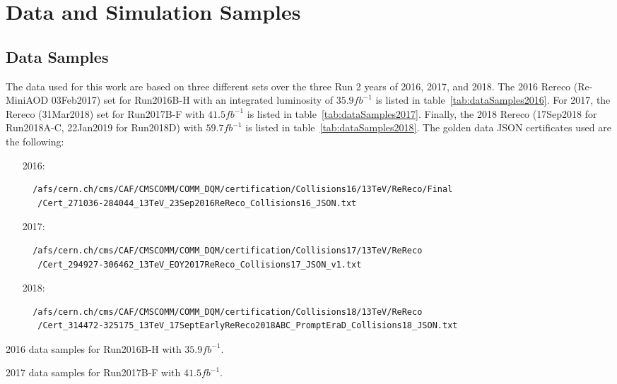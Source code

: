 
\chapter{Data and Simulation Samples}
\label{chap:appendixSamples}

\section{Data Samples}

The data used for this work are based on three different sets over the three Run 2 years of 2016, 2017, and 2018.
The 2016 Rereco (Re-MiniAOD 03Feb2017) set for Run2016B-H with an integrated luminosity of $35.9\unit{fb^{-1}}$ is listed in table~\ref{tab:dataSamples2016}.
For 2017, the Rereco (31Mar2018) set for Run2017B-F with $41.5\unit{fb^{-1}}$ is listed in table~\ref{tab:dataSamples2017}.
Finally, the 2018 Rereco (17Sep2018 for Run2018A-C, 22Jan2019 for Run2018D) with $59.7\unit{fb^{-1}}$ is listed in table~\ref{tab:dataSamples2018}\footnotemark.
The golden data JSON certificates used are the following:
\begin{itemize}
  \item[2016:]
  \begingroup
  \fontsize{9pt}{12pt}
  \begin{verbatim}
  /afs/cern.ch/cms/CAF/CMSCOMM/COMM_DQM/certification/Collisions16/13TeV/ReReco/Final
   /Cert_271036-284044_13TeV_23Sep2016ReReco_Collisions16_JSON.txt
  \end{verbatim}
  \endgroup
  \item[2017:]
  \begingroup
  \fontsize{9pt}{12pt}
  \begin{verbatim}
  /afs/cern.ch/cms/CAF/CMSCOMM/COMM_DQM/certification/Collisions17/13TeV/ReReco
   /Cert_294927-306462_13TeV_EOY2017ReReco_Collisions17_JSON_v1.txt
  \end{verbatim}
  \endgroup
  \item[2018:]
  \begingroup
  \fontsize{9pt}{12pt}
  \begin{verbatim}
  /afs/cern.ch/cms/CAF/CMSCOMM/COMM_DQM/certification/Collisions18/13TeV/ReReco
   /Cert_314472-325175_13TeV_17SeptEarlyReReco2018ABC_PromptEraD_Collisions18_JSON.txt
  \end{verbatim}
  \endgroup
\end{itemize}

\begin{table}[htbp]
  \centering
  
  \caption{
    2016 data samples for Run2016B-H with $35.9\unit{fb^{-1}}$.
  }
  \label{tab:dataSamples2016}
\end{table}
\begin{table}[htbp]
  \centering
  
  \caption{
    2017 data samples for Run2017B-F with $41.5\unit{fb^{-1}}$.
  }
  \label{tab:dataSamples2017}
\end{table}

